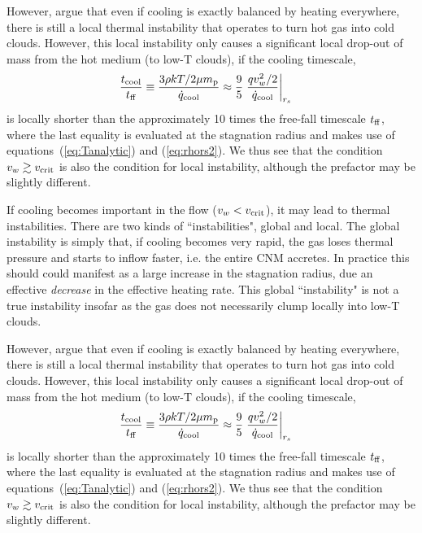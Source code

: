 \documentclass[usenatbib,fleqn]{mn2e}
\newcommand{\rs}{r_s}
\newcommand{\vw}{v_w}
\renewcommand{\mp}{m_{\rm p}}
\newcommand{\tcool}{t_{\rm cool}}
\newcommand{\tff}{t_{\rm ff}}
\begin{document}
However, \citet{McCourt+12} argue that even if cooling is exactly balanced by heating everywhere, there is still a local thermal instability that operates to turn hot gas into cold clouds.  However, this local instability only causes a significant local drop-out of mass from the hot medium (to low-T clouds), if the cooling timescale,
\begin{align}
\frac{\tcool}{\tff} &\equiv \frac{3\rho k T/2 \mu \mp}{\dot{q}_{\rm cool}} \approx \frac{9}{5} \left. \frac{q \vw^2/2}{\dot{q}_{\rm cool}}\right|_{\rs}
\end{align} 
is locally shorter than the approximately 10 times the free-fall
timescale $t_{\rm ff}$, where the last equality is evaluated at the stagnation radius and makes use of equations~(\ref{eq:Tanalytic}) and (\ref{eq:rhors2}).  We thus see that the condition $v_w \gtrsim v_{\rm crit}$ is also the condition for local instability, although the prefactor may be slightly different.

If cooling becomes important in the flow ($v_{w} < v_{\rm crit}$), it may lead to thermal instabilities.  There are two kinds of ``instabilities", global and local.  The global instability is simply that, if cooling becomes very rapid, the gas loses thermal pressure and starts to inflow faster, i.e. the entire CNM accretes.  In
practice this should could manifest as a large increase in the stagnation radius, due an effective {\it decrease} in the effective heating rate.  This global ``instability" is not a true instability insofar as the gas does not necessarily clump locally into low-T clouds.

However, \citet{McCourt+12} argue that even if cooling is exactly balanced by heating everywhere, there is still a local thermal instability that operates to turn hot gas into cold clouds.  However, this local instability only causes a significant local drop-out of mass from the hot medium (to low-T clouds), if the cooling timescale,
\begin{align}
\frac{\tcool}{\tff} &\equiv \frac{3\rho k T/2 \mu \mp}{\dot{q}_{\rm cool}} \approx \frac{9}{5} \left. \frac{q \vw^2/2}{\dot{q}_{\rm cool}}\right|_{\rs}
\end{align} 
is locally shorter than the approximately 10 times the free-fall
timescale $t_{\rm ff}$, where the last equality is evaluated at the stagnation radius and makes use of equations~(\ref{eq:Tanalytic}) and (\ref{eq:rhors2}).  We thus see that the condition $v_w \gtrsim v_{\rm crit}$ is also the condition for local instability, although the prefactor may be slightly different.
\end{document}
